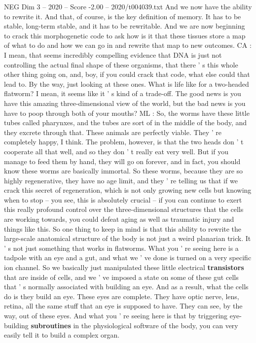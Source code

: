 \begin{textsample}{NEG Dim 3 – 2020 – Score -2.00 – 2020/t004039.txt}
And we now have the ability to rewrite it.
And that, of course, is the key definition of memory.
It has to be stable, long-term stable, and it has to be rewritable.
And we are now beginning to crack this morphogenetic code to ask how is it that these tissues store a map of what to do and how we can go in and rewrite that map to new outcomes.
CA : I mean, that seems incredibly compelling evidence that DNA is just not controlling the actual final shape of these organisms, that there ' s this whole other thing going on, and, boy, if you could crack that code, what else could that lead to.
By the way, just looking at these ones.
What is life like for a two-headed flatworm?
I mean, it seems like it ' s kind of a trade-off.
The good news is you have this amazing three-dimensional view of the world, but the bad news is you have to poop through both of your mouths?
ML : So, the worms have these little tubes called pharynxes, and the tubes are sort of in the middle of the body, and they excrete through that.
These animals are perfectly viable.
They ' re completely happy, I think.
The problem, however, is that the two heads don ' t cooperate all that well, and so they don ' t really eat very well.
But if you manage to feed them by hand, they will go on forever, and in fact, you should know these worms are basically immortal.
So these worms, because they are so highly regenerative, they have no age limit, and they ' re telling us that if we crack this secret of regeneration, which is not only growing new cells but knowing when to stop -- you see, this is absolutely crucial -- if you can continue to exert this really profound control over the three-dimensional structures that the cells are working towards, you could defeat aging as well as traumatic injury and things like this.
So one thing to keep in mind is that this ability to rewrite the large-scale anatomical structure of the body is not just a weird planarian trick.
It ' s not just something that works in flatworms.
What you ' re seeing here is a tadpole with an eye and a gut, and what we ' ve done is turned on a very specific ion channel.
So we basically just manipulated these little electrical \textbf{transistors} that are inside of cells, and we ' ve imposed a state on some of these gut cells that ' s normally associated with building an eye.
And as a result, what the cells do is they build an eye.
These eyes are complete.
They have optic nerve, lens, retina, all the same stuff that an eye is supposed to have.
They can see, by the way, out of these eyes.
And what you ' re seeing here is that by triggering eye-building \textbf{subroutines} in the physiological software of the body, you can very easily tell it to build a complex organ.

\end{textsample}
